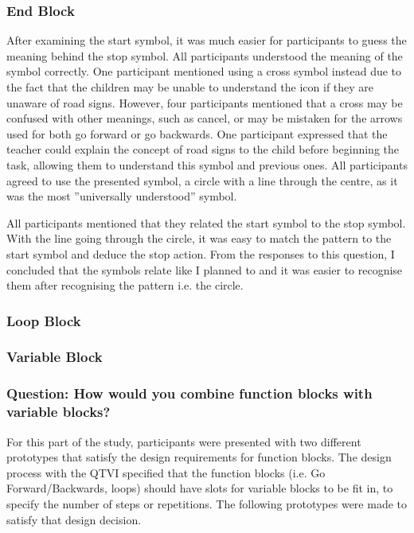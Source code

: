 \documentclass[oneside,%
                    author={Malak Hajji},
                    degree={BSc},
                    title={Designing An Accessible Computational Toolkit For Students},
                  subtitle={With Mixed Visual Abilities}]{dissertation}
\begin{document}
\subsubsection{End Block}
After examining the start symbol, it was much easier for participants to guess the meaning behind the stop symbol. All participants understood the meaning of the symbol correctly. One participant mentioned using a cross symbol instead due to the fact that the children may be unable to understand the icon if they are unaware of road signs. However, four participants mentioned that a cross may be confused with other meanings, such as cancel, or may be mistaken for the arrows used for both go forward or go backwards. One participant expressed that the teacher could explain the concept of road signs to the child before beginning the task, allowing them to understand this symbol and previous ones. All participants agreed to use the presented symbol, a circle with a line through the centre, as it was the most ”universally understood” symbol. 

All participants mentioned that they related the start symbol to the stop symbol. With the line going through the circle, it was easy to match the pattern to the start symbol and deduce the stop action. From the responses to this question, I concluded that the symbols relate like I planned to and it was easier to recognise them after recognising the pattern i.e. the circle. 

\subsubsection{Loop Block}


\subsubsection{Variable Block}



\subsubsection{Question: How would you combine function blocks with variable blocks?}
For this part of the study, participants were presented with two different prototypes that satisfy the design requirements for function blocks. The design process with the QTVI specified that the function blocks (i.e. Go Forward/Backwards, loops) should have slots for variable blocks to be fit in, to specify the number of steps or repetitions. The following prototypes were made to satisfy that design decision.
\end{document}
